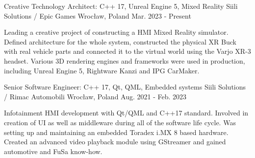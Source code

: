 

\begin{cventries}

  \cventry %
    {Creative Technology Architect: C++ 17, Unreal Engine 5, Mixed Reality} %
    {Siili Solutions / Epic Games} %
    {Wrocław, Poland} %
    {Mar. 2023 - Present} %
    {
        \begin{cvitems} %
            Leading a creative project of constructing a HMI Mixed Reality simulator. Defined architecture for the whole system, constructed the physical XR Buck with real vehicle parts and connected it to the virtual world using the Varjo XR-3 headset. Various 3D rendering engines and frameworks were used in production, including Unreal Engine 5, Rightware Kanzi and IPG CarMaker.
        \end{cvitems}
    }

  \cventry
    {Senior Software Engineer: C++ 17, Qt, QML, Embedded systems} %
    {Siili Solutions / Rimac Automobili} %
    {Wrocław, Poland} %
    {Aug. 2021 - Feb. 2023} %
    {
        \begin{cvitems} %
            Infotainment HMI development with Qt/QML and C++17 standard. Involved in creation of UI as well as middleware during all of the software life cycle. Was setting up and maintaining an embedded Toradex i.MX 8 based hardware. Created an advanced video playback module using GStreamer and gained automotive and FuSa know-how.
        \end{cvitems}
    }


\end{cventries}
